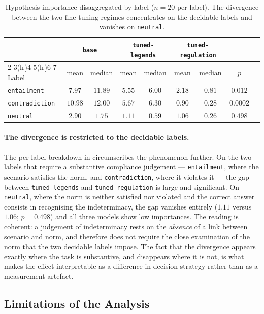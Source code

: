 \documentclass[pdflatex, sn-apa]{sn-jnl}%
\theoremstyle{thmstyleone}%
\theoremstyle{thmstyletwo}%
\theoremstyle{thmstylethree}%
\newcommand{\modelbase}{\texttt{base}}
\newcommand{\modellegends}{\texttt{tuned-legends}}
\newcommand{\modelreg}{\texttt{tuned-regulation}}
\begin{document}
\begin{table}[h]
\centering
\caption{Hypothesis importance disaggregated by label ($n=20$ per label). The
divergence between the two fine-tuning regimes concentrates on the decidable
labels and vanishes on \texttt{neutral}.}
\label{tab:xai_labels}
\small
\begin{tabular}{@{}lcccccccc@{}}
\toprule
& \multicolumn{2}{c}{\modelbase} & \multicolumn{2}{c}{\modellegends} & \multicolumn{2}{c}{\modelreg} & \\
\cmidrule(lr){2-3}\cmidrule(lr){4-5}\cmidrule(lr){6-7}
Label & mean & median & mean & median & mean & median & $p$ \\
\midrule
\texttt{entailment}    & $7.97$  & $11.89$ & $5.55$ & $6.00$ & $2.18$ & $0.81$ & $\mathbf{0.012}$ \\
\texttt{contradiction} & $10.98$ & $12.00$ & $5.67$ & $6.30$ & $0.90$ & $0.28$ & $\mathbf{0.0002}$ \\
\texttt{neutral}       & $2.90$  & $1.75$  & $1.11$ & $0.59$ & $1.06$ & $0.26$ & $0.498$ \\
\bottomrule
\end{tabular}
\end{table}

\paragraph{The divergence is restricted to the decidable labels.}
The per-label breakdown in  circumscribes the phenomenon
further. On the two labels that require a substantive compliance judgement ---
\texttt{entailment}, where the scenario satisfies the norm, and
\texttt{contradiction}, where it violates it --- the gap between \modellegends{}
and \modelreg{} is large and significant. On \texttt{neutral}, where the norm is
neither satisfied nor violated and the correct answer consists in recognising the
indeterminacy, the gap vanishes entirely ($1.11$ versus $1.06$; $p = 0.498$) and
all three models show low importances. The reading is coherent: a judgement of
indeterminacy rests on the \emph{absence} of a link between scenario and norm, and
therefore does not require the close examination of the norm that the two
decidable labels impose. The fact that the divergence appears exactly where the
task is substantive, and disappears where it is not, is what makes the effect
interpretable as a difference in decision strategy rather than as a measurement
artefact.

\subsection{Limitations of the Analysis}
\label{sec:xai:limits}
\end{document}
